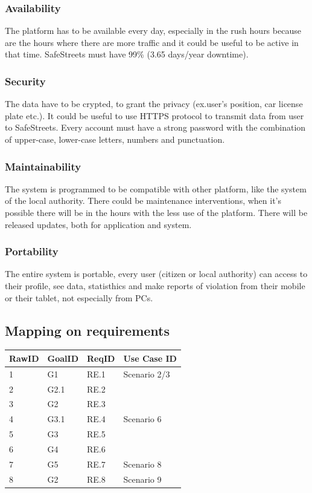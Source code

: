 \subsubsection{Availability}
The platform has to be available every day, especially in the rush hours because are the hours where there are more traffic and it could be useful to be active in that time. SafeStreets must have 99\% (3.65 days/year downtime).
\subsubsection{Security}
The data have to be crypted, to grant the privacy (ex.user's position, car license plate etc.). It could be useful to use HTTPS protocol to transmit data from user to SafeStreets.
Every account must have a strong password with the combination of upper-case, lower-case letters, numbers and punctuation.
\subsubsection{Maintainability}
The system is programmed to be compatible with other platform, like the system of the local authority.
There could be maintenance interventions, when it's possible there will be in the hours with the less use of the platform.
There will be released updates, both for application and system.
\subsubsection{Portability}
The entire system is portable, every user (citizen or local authority) can access to their profile, see data, statisthics and make reports of violation from their mobile or their tablet, not especially from PCs.
\subsection{Mapping on requirements}
\begin{center}
	\begin{tabular}{ | l | p{2cm} | p{2cm}| p{2cm}|} 
		\hline
		 RawID & GoalID & ReqID & Use Case ID \\
		\hline
		1&G1&RE.1&Scenario 2/3\\
		\hline
		2&G2.1&RE.2&\\
		\hline
		3&G2&RE.3&\\
		\hline
		4&G3.1&RE.4&Scenario 6\\
		\hline
		5&G3&RE.5&\\
		\hline
		6&G4&RE.6&\\
		\hline
		7&G5&RE.7&Scenario 8\\
		\hline
		8&G2&RE.8&Scenario 9\\
		\hline
	\end{tabular}
\end{center}


 